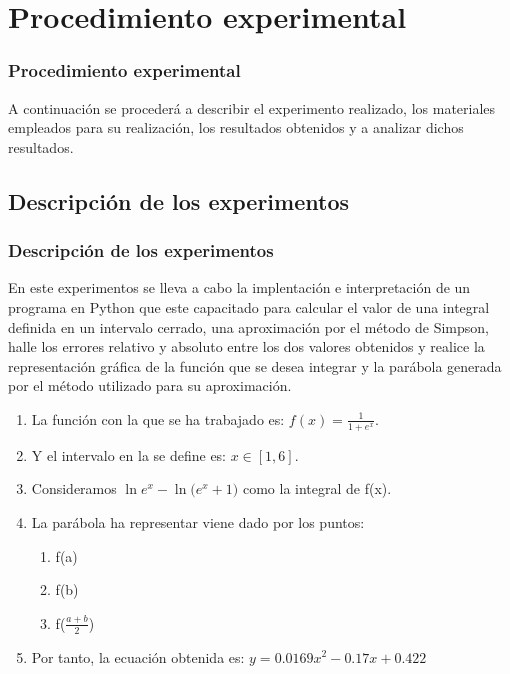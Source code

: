 \documentclass{beamer}
\begin{document}
\section{Procedimiento experimental}

\begin{frame}
\frametitle{Procedimiento experimental}

	A continuación se procederá a describir el experimento realizado, los materiales empleados para su realización,
los resultados obtenidos y a analizar dichos resultados.

\end{frame}

\subsection{Descripción de los experimentos}

\begin{frame}
\frametitle{Descripción de los experimentos}
	En este experimentos se lleva a cabo la implentación e interpretación de un programa en Python que
 este capacitado para calcular el valor de una integral definida en un intervalo cerrado, una aproximación por 
 el método de Simpson, halle los errores relativo y absoluto entre los dos valores obtenidos y realice la representación
gráfica de la función que se desea integrar y la parábola generada por el método utilizado
para su aproximación.
 	
 \begin{enumerate}
    \item La función con la que se ha trabajado es: $f(x) = \frac{1}{1+e^{x}}$.
    \pause
    \item Y el intervalo en la se define es: $x \in [1, 6]$.
    \pause
    \item Consideramos $\ln{e^{x}} - \ln({e^{x}+1)}$ como la integral de f(x).
    \pause
    \item La parábola ha representar viene dado por los puntos:
    \begin{enumerate}
      \item f(a)
      \pause
      \item f(b)
      \pause
      \item f($\frac{a+b}{2}$)
    \end{enumerate}
    \pause
    \item Por tanto, la ecuación obtenida es: $y = 0.0169x^2 - 0.17x + 0.422 $    
 \end{enumerate}
\end{frame}
\end{document}
